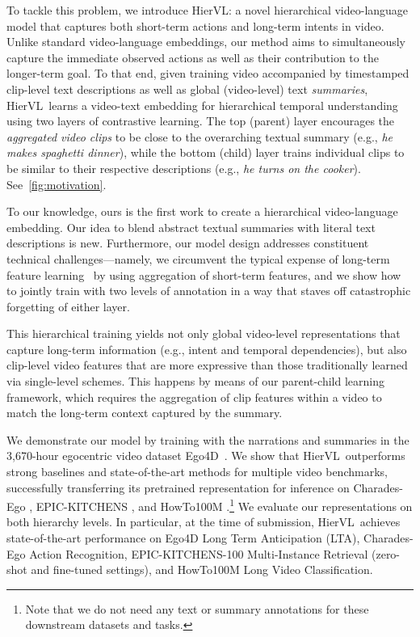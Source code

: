 \documentclass[10pt,twocolumn,letterpaper]{article}
\newcommand{\modelname}[0]{{HierVL}}
\begin{document}
To tackle this problem, we introduce \modelname: a novel hierarchical video-language model that captures both short-term actions and long-term intents in video.  Unlike standard video-language embeddings, our method aims to simultaneously capture the immediate observed actions as well as their contribution to the longer-term goal.
To that end, given training video accompanied by timestamped clip-level text descriptions as well as global (video-level) text \emph{summaries}, \modelname~learns a video-text embedding for hierarchical temporal understanding using two layers of contrastive learning.  The top (parent) layer encourages the \emph{aggregated video clips} to be close to the overarching textual summary (e.g., \emph{he makes spaghetti dinner}), while the bottom (child) layer trains individual clips to be similar to their respective descriptions (e.g., \emph{he turns on the cooker}).  
See~\cref{fig:motivation}.


To our knowledge, ours is the first work to create a hierarchical video-language embedding.  Our idea to blend abstract textual summaries with literal text descriptions is new.  Furthermore, our model design addresses constituent technical challenges---namely, we circumvent the typical expense of long-term feature learning~\cite{memvit,scsampler,clip-hitchhiker} by using aggregation of short-term features, and we show how to jointly train with two levels of annotation in a way that staves off catastrophic forgetting of either layer.   


This hierarchical training yields not only global video-level representations that capture long-term information (e.g., intent and temporal dependencies), but also clip-level video features that are more expressive than those traditionally learned via single-level schemes. This happens by means of our parent-child learning framework, which requires the aggregation of clip features within a video to match the long-term context captured by the summary. 

We demonstrate our model by training with the narrations and summaries in the 3,670-hour egocentric video dataset Ego4D~\cite{ego4d,ego4dcons}.  
We show that \modelname~outperforms strong baselines and state-of-the-art methods for multiple video benchmarks, successfully transferring its pretrained representation for inference on Charades-Ego \cite{charades-ego}, EPIC-KITCHENS \cite{epic-kitchens-100}, and HowTo100M \cite{howto100m}.\footnote{Note that we do not need any text or summary annotations for these downstream datasets and tasks.}
We evaluate our representations on both hierarchy levels.
In particular, at the time of submission, \modelname~achieves state-of-the-art performance on Ego4D Long Term Anticipation (LTA), Charades-Ego Action Recognition, EPIC-KITCHENS-100 Multi-Instance Retrieval (zero-shot and fine-tuned settings), and HowTo100M Long Video Classification.
\end{document}
